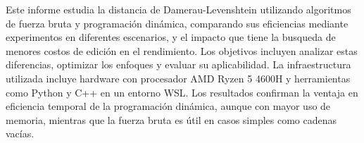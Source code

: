 Este informe estudia la distancia de Damerau-Levenshtein utilizando algoritmos de fuerza bruta y programación dinámica,
comparando sus eficiencias mediante experimentos en diferentes escenarios, y el impacto que tiene la busqueda de menores costos de edición 
en el rendimiento. Los objetivos incluyen analizar estas diferencias, optimizar los enfoques y evaluar su aplicabilidad. La 
infraestructura utilizada incluye hardware con procesador AMD Ryzen 5 4600H y herramientas como Python y C++ en un entorno WSL. 
Los resultados confirman la ventaja en eficiencia temporal de la programación dinámica, aunque con mayor uso de memoria, mientras 
que la fuerza bruta es útil en casos simples como cadenas vacías.
